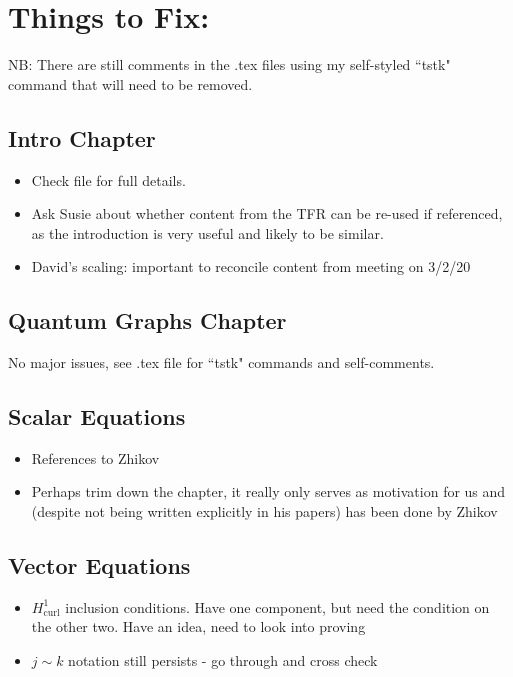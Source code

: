 \documentclass{article}
\begin{document}
\section*{Things to Fix:}
NB: There are still comments in the .tex files using my self-styled ``tstk" command that will need to be removed.

\subsection*{Intro Chapter}
\begin{itemize}
	\item Check file for full details.
	\item Ask Susie about whether content from the TFR can be re-used if referenced, as the introduction is very useful and likely to be similar.
	\item David's scaling: important to reconcile content from meeting on 3/2/20
\end{itemize}

\subsection*{Quantum Graphs Chapter}
No major issues, see .tex file for ``tstk" commands and self-comments.

\subsection*{Scalar Equations}
\begin{itemize}
	\item References to Zhikov
	\item Perhaps trim down the chapter, it really only serves as motivation for us and (despite not being written explicitly in his papers) has been done by Zhikov
\end{itemize}

\subsection*{Vector Equations}
\begin{itemize}
	\item $H^1_{\mathrm{curl}}$ inclusion conditions. Have one component, but need the condition on the other two. Have an idea, need to look into proving
	\item $j\sim k$ notation still persists - go through and cross check
\end{itemize}
\end{document}
